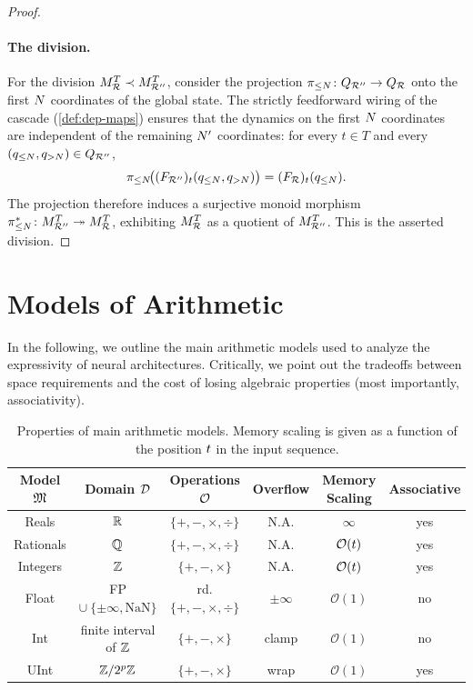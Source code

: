 \documentclass{article}
\begin{document}
\begin{proof}
\paragraph{The division.}For the division $M_{\mathcal{R}}^T \prec M_{\mathcal{R}''}^T$, consider the projection $\pi_{\leq N} \colon Q_{\mathcal{R}''} \to Q_{\mathcal{R}}$ onto the first $N$ coordinates of the global state. 
The strictly feedforward wiring of the cascade (\cref{def:dep-maps}) ensures that the dynamics on the first $N$ coordinates are independent of the remaining $N'$ coordinates: for every $t \in T$ and every $(q_{\leq N}, q_{>N}) \in Q_{\mathcal{R}''}$,
$$
\pi_{\leq N}\!\bigl((F_{\mathcal{R}''})_t(q_{\leq N}, q_{>N})\bigr) = (F_{\mathcal{R}})_t(q_{\leq N}).
$$
The projection therefore induces a surjective monoid morphism $\pi_{\leq N}^* \colon M_{\mathcal{R}''}^T \twoheadrightarrow M_{\mathcal{R}}^T$, exhibiting $M_{\mathcal{R}}^T$ as a quotient of $M_{\mathcal{R}''}^T$. This is the asserted division.
\end{proof}



\section{Models of Arithmetic}\label{app:precision}

In the following, we outline the main arithmetic models used to analyze the expressivity of neural architectures.
Critically, we point out the tradeoffs between space requirements and the cost of losing algebraic properties (most importantly, associativity).

\begin{table}[]
    \caption{Properties of main arithmetic models. Memory scaling is given as a function of the position $t$ in the input sequence.}
    \centering
    \begin{tabular}{c|c c c c c}
         Model $\mathfrak{M}$ & Domain $\mathcal{D}$ & Operations $\mathcal{O}$ & Overflow & Memory Scaling & Associative \\
         \hline
         Reals & $\mathbb{R}$ & $\{+,-,\times,\div\}$ & N.A. & $\infty $ & yes\\
         Rationals & $\mathbb{Q}$ & $\{+,-,\times,\div\}$ & N.A. & $\mathcal{O}(t)$ & yes\\
         Integers & $\mathbb{Z}$ & $\{+, -, \times\}$ & N.A. & $\mathcal{O}(t)$ & yes \\ 
         Float & FP $\cup\ \{\pm\infty, \text{NaN}\}$ & rd. $\{+,-,\times,\div\}$ & $\pm\infty$ &  $\mathcal{O}(1)$ & no\\
         Int & finite interval of $\mathbb{Z}$ & $\{+,-, \times\}$ & clamp & $\mathcal{O}(1)$ & no\\ 
         UInt & $\mathbb{Z}/2^p\mathbb{Z}$ & $\{+,-, \times\}$ & wrap & $\mathcal{O}(1)$ & yes\\ 
    \end{tabular}
    \label{tab:arithmetic_models}
\end{table}
\end{document}
